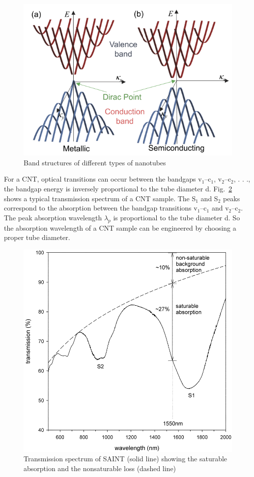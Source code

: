 \documentclass{phyasgn}\usepackage{nag}
\newcommand{\figref}[1]{Fig.~\ref{#1}}
\begin{document}
\begin{figure}[!h]
	\centering
	\includegraphics[width=.65\linewidth]{pic/1.png}
	\caption[Band structures]{Band structures of different types of nanotubes\cite{set2004ultrafast}}
	\label{1}
	\end{figure}
\par For a CNT, optical transitions can occur between the bandgaps v$_1$–c$_1$, v$_2$–c$_2$, . . ., the bandgap energy is inversely proportional to the tube diameter d. \figref{4} shows a typical transmission spectrum of a CNT sample. The S$_1$ and S$_2$ peaks correspond to the absorption between the bandgap transitions v$_1$–c$_1$ and v$_2$–c$_2$. The peak absorption wavelength $\lambda_p$ is proportional to the tube diameter d. So the absorption wavelength of a CNT sample can be engineered by choosing a proper tube diameter.
\begin{figure}[!h]
	\centering
	\includegraphics[width=.6\linewidth]{pic/4.png}
	\caption[Band structures]{Transmission spectrum of SAINT (solid line) showing the saturable absorption and the nonsaturable loss (dashed line)\cite{set2004ultrafast}}
	\label{4}
	\end{figure}
\end{document}
